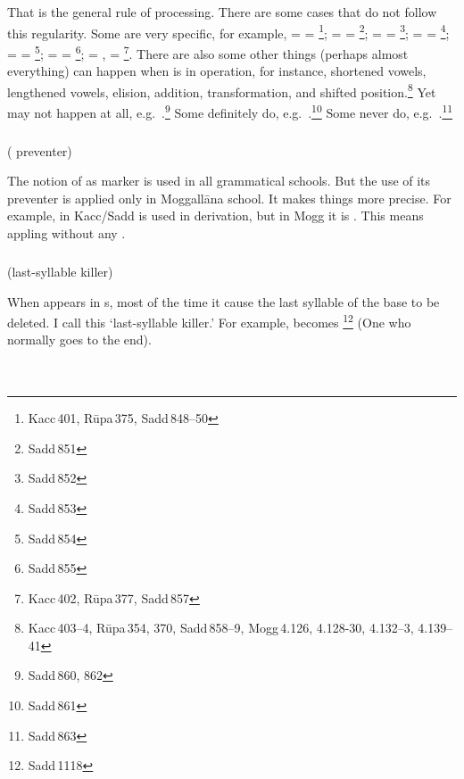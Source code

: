 That is the general rule of  processing. There are some cases that do not follow this regularity. Some are very specific, for example,  =  = \footnote{Kacc\,401, R\=upa\,375, Sadd\,848--50};  =  = \footnote{Sadd\,851};  =  = \footnote{Sadd\,852};  =  = \footnote{Sadd\,853};  =  = \footnote{Sadd\,854};  =  = \footnote{Sadd\,855};  = ,  = \footnote{Kacc\,402, R\=upa\,377, Sadd\,857}. There are also some other things (perhaps almost everything) can happen when  is in operation, for instance, shortened vowels, lengthened vowels, elision, addition, transformation, and shifted  position.\footnote{Kacc\,403--4, R\=upa\,354, 370, Sadd\,858--9, Mogg\,4.126, 4.128-30, 4.132--3, 4.139--41} Yet  may not happen at all, e.g.\ .\footnote{Sadd\,860, 862} Some definitely do, e.g.\ .\footnote{Sadd\,861} Some never do, e.g.\ .\footnote{Sadd\,863}

\subparagraph*{} ( preventer)

The notion of  as  marker is used in all grammatical schools. But the use of its preventer is applied only in Moggall\=ana school. It makes things more precise. For example, in Kacc/Sadd  is used in derivation, but in Mogg it is . This means appling  without any .

\subparagraph*{} (last-syllable killer)

When  appears in s, most of the time it cause the last syllable of the base to be deleted. I call this `last-syllable killer.' For example,  becomes \footnote{Sadd\,1118} (One who normally goes to the end).

\paragraph*{} \ 


